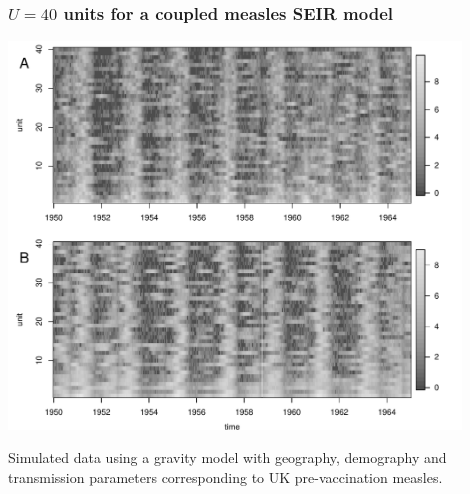 \documentclass{beamer}
\begin{document}
\begin{frame}
\frametitle{$U=40$ units for a coupled measles SEIR model}

\vspace{-5mm}

\begin{center}
\includegraphics[width=12cm]{slice_image_plot-1.pdf}


\end{center}

\vspace{-2mm}

Simulated data using a gravity model with geography, demography and transmission parameters corresponding to UK pre-vaccination measles.


\end{frame}
\end{document}
